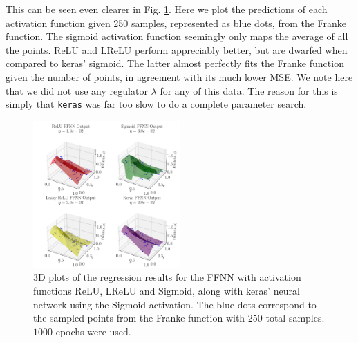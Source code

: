 \documentclass[%
reprint,
amsmath,amssymb,
aps,
]{revtex4-2}
\begin{document}
This can be seen even clearer in Fig. \ref{fig:3D_Franke}. Here we plot the predictions of each activation function given 250 samples, represented as blue dots, from the Franke function. The sigmoid activation function seemingly only maps the average of all the points. ReLU and LReLU perform appreciably better, but are dwarfed when compared to keras' sigmoid. The latter almost perfectly fits the Franke function given the number of points, in agreement with its much lower MSE. We note here that we did not use any regulator $\lambda$ for any of this data. The reason for this is simply that \texttt{keras} was far too slow to do a complete parameter search.
\begin{figure}[ht!]
\centering
\includegraphics[width=0.5\textwidth]{Python/Figures/NN_3D_Predict_Franke_Epochs1000.pdf}
\caption{3D plots of the regression results for the FFNN with activation functions ReLU, LReLU and Sigmoid, along with keras' neural network using the Sigmoid activation. The blue dots correspond to the sampled points from the Franke function with $250$ total samples. $1000$ epochs were used.}
\label{fig:3D_Franke}
\end{figure}
\end{document}
